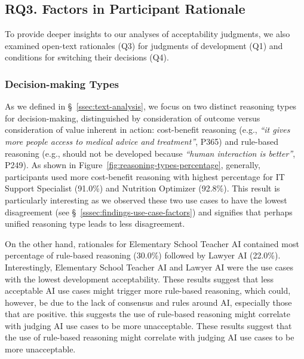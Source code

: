 \subsection{RQ3. Factors in Participant Rationale}
\label{sec:RQ3}
To provide deeper insights to our analyses of acceptability judgments, we also examined open-text rationales (Q3) for judgments of development (Q1) and conditions for switching their decisions (Q4). 


\subsubsection{Decision-making Types}
As we defined in \S~\ref{ssec:text-analysis}, we focus on two distinct reasoning types for decision-making, distinguished by consideration of outcome versus consideration of value inherent in action: cost-benefit reasoning (e.g., \textit{``it gives more people access to medical advice and treatment''}, P365) and rule-based reasoning (e.g., should not be developed because \textit{``human interaction is better''}, P249). 
As shown in Figure~\ref{fig:reasoning-types-percentage}, generally, participants used more cost-benefit reasoning with highest percentage for IT Support Specialist (91.0\%) and Nutrition Optimizer (92.8\%). This result is particularly interesting as we observed these two use cases to have the lowest disagreement (see \S~\ref{sssec:findings-use-case-factors}) and signifies that perhaps unified reasoning type leads to less disagreement. 

On the other hand, rationales for Elementary School Teacher AI contained most percentage of rule-based reasoning (30.0\%) followed by Lawyer AI (22.0\%). Interestingly, Elementary School Teacher AI and Lawyer AI were the use cases with the lowest development acceptability. These results suggest that less acceptable AI use cases might trigger more rule-based reasoning, which could, however, be due to the lack of consensus and rules around AI, especially those that are positive. this suggests the use of rule-based reasoning might correlate with judging AI use cases to be more unacceptable. These results suggest that the use of rule-based reasoning might correlate with judging AI use cases to be more unacceptable. 

